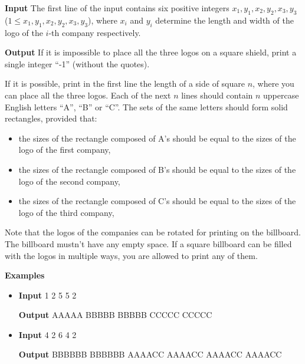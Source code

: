 \normalfont\documentclass[letterpaper,11pt]{article}
\begin{document}
\textbf{Input} \newline
The first line of the input contains six positive integers $x_1, y_1, x_2, y_2, x_3, y_3$ ($1 \leq x_1, y_1, x_2, y_2, x_3, y_3$), where $x_i$ and $y_i$ determine the length and width of the logo of the $i$-th company respectively.

\textbf{Output} \newline
If it is impossible to place all the three logos on a square shield, print a single integer ``-1'' (without the quotes).

If it is possible, print in the first line the length of a side of square $n$, where you can place all the three logos. Each of the next $n$ lines should contain $n$ uppercase English letters ``A'', ``B'' or ``C''. The sets of the same letters should form solid rectangles, provided that:

\begin{itemize}
\item the sizes of the rectangle composed of A's should be equal to the sizes of the logo of the first company,
\item the sizes of the rectangle composed of B's should be equal to the sizes of the logo of the second company,
\item the sizes of the rectangle composed of C's should be equal to the sizes of the logo of the third company, 
\end{itemize}

Note that the logos of the companies can be rotated for printing on the billboard. The billboard mustn't have any empty space. If a square billboard can be filled with the logos in multiple ways, you are allowed to print any of them.

\textbf{Examples}
\begin{itemize}
\item \textbf{Input}  1 2 5 5 2

\textbf{Output}  \newline
AAAAA \newline
BBBBB \newline
BBBBB \newline
CCCCC \newline
CCCCC

\item \textbf{Input}  4 2 6 4 2

\textbf{Output}  \newline
BBBBBB \newline
BBBBBB \newline
AAAACC \newline
AAAACC \newline
AAAACC \newline
AAAACC

\end{itemize}
\end{document}
